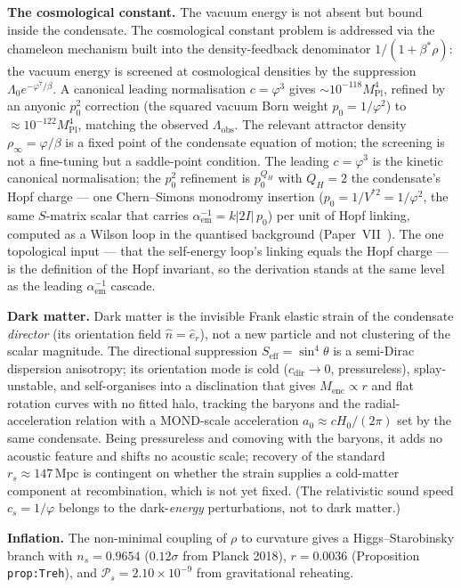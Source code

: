 \documentclass[11pt,a4paper]{article}
\newcommand{\vp}{\varphi}
\newcommand{\aem}{\alpha_{\mathrm{em}}}
\newcommand{\bst}{\beta^*}
\begin{document}
\textbf{The cosmological constant.}
The vacuum energy is not absent but bound inside the condensate. The cosmological constant problem is addressed via the chameleon mechanism
built into the density-feedback denominator $1/(1+\bst\rho)$: the vacuum energy
is screened at cosmological densities by the suppression $\Lambda_0 e^{-\vp^7/\beta}$. A canonical leading normalisation $c=\varphi^3$ gives $\sim10^{-118}M_{\mathrm{Pl}}^4$, refined by an anyonic $p_0^2$ correction (the squared vacuum Born weight $p_0=1/\varphi^2$) to $\approx10^{-122}M_{\mathrm{Pl}}^4$, matching the observed $\Lambda_{\mathrm{obs}}$. The relevant attractor density $\rho_\infty = \vp/\beta$ is a fixed point of the
condensate equation of motion; the screening is not a fine-tuning but
a saddle-point condition. The leading $c=\varphi^3$ is the kinetic canonical normalisation; the $p_0^2$ refinement is $p_0^{Q_H}$ with $Q_H=2$ the condensate's Hopf charge --- one Chern--Simons monodromy insertion ($p_0=1/V^{*2}=1/\varphi^2$, the same $S$-matrix scalar that carries $\aem^{-1}=k|2I|\,p_0$) per unit of Hopf linking, computed as a Wilson loop in the quantised background (Paper~VII~\cite{Paper7}). The one topological input --- that the self-energy loop's linking equals the Hopf charge --- is the definition of the Hopf invariant, so the derivation stands at the same level as the leading $\aem^{-1}$ cascade.

\textbf{Dark matter.}
Dark matter is the invisible Frank elastic strain of the condensate
\emph{director} (its orientation field $\hat{n}=\hat{e}_r$), not a new
particle and not clustering of the scalar magnitude. The directional
suppression $S_{\mathrm{eff}}=\sin^4\theta$ is a semi-Dirac dispersion
anisotropy; its orientation mode is cold ($c_{\mathrm{dir}}\to0$,
pressureless), splay-unstable, and self-organises into a disclination
that gives $M_{\mathrm{enc}}\propto r$ and flat rotation curves with no
fitted halo, tracking the baryons and the radial-acceleration relation
with a MOND-scale acceleration $a_0\approx cH_0/(2\pi)$ set by the same
condensate. Being pressureless and comoving with the baryons, it adds
no acoustic feature and shifts no acoustic scale; recovery of the
standard $r_s\approx147\,\mathrm{Mpc}$ is contingent on whether the strain
supplies a cold-matter component at recombination, which is not yet fixed.
(The relativistic sound speed $c_s=1/\vp$ belongs to the
dark-\emph{energy} perturbations, not to dark matter.)

\textbf{Inflation.}
The non-minimal coupling of $\rho$ to curvature gives a Higgs--Starobinsky
branch with $n_s=0.9654$ ($0.12\sigma$ from Planck 2018),
$r=0.0036$ (Proposition \texttt{prop:Treh}),
and $\mathcal{P}_s = 2.10\times10^{-9}$ from gravitational reheating.
\end{document}
